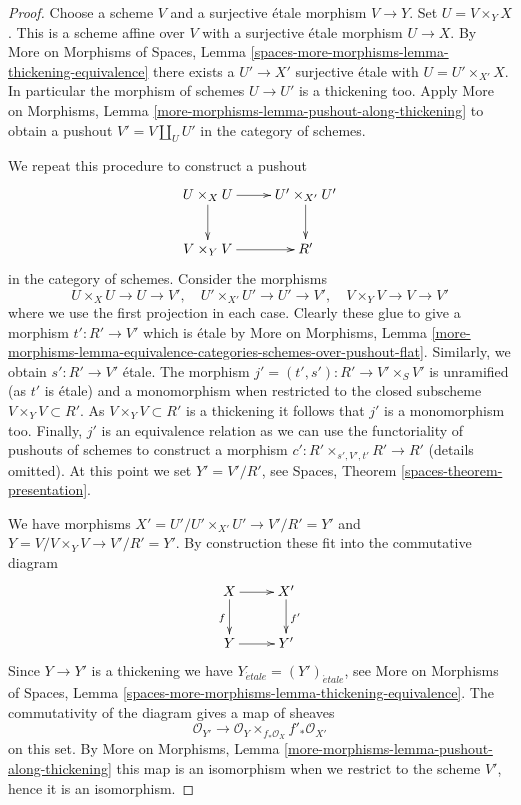 \documentclass[10pt,a4paper]{amsart}
\theoremstyle{plain}
\theoremstyle{definition}
\theoremstyle{remark}
\numberwithin{equation}{subsection}
\def\etale{{\acute{e}tale}}
\begin{document}
\begin{proof}
Choose a scheme $V$ and a surjective \'etale morphism $V \to Y$.
Set $U = V \times_Y X$. This is a scheme affine over $V$ with a
surjective \'etale morphism $U \to X$. By More on Morphisms of Spaces,
Lemma \ref{spaces-more-morphisms-lemma-thickening-equivalence}
there exists a $U' \to X'$
surjective \'etale with $U = U' \times_{X'} X$. In particular the
morphism of schemes $U \to U'$ is a thickening too. Apply
More on Morphisms, Lemma \ref{more-morphisms-lemma-pushout-along-thickening}
to obtain a pushout $V' = V \amalg_U U'$ in the category of schemes.

\medskip\noindent
We repeat this procedure to construct a pushout
$$
\xymatrix{
U \times_X U \ar[d] \ar[r] & U' \times_{X'} U' \ar[d] \\
V \times_Y V \ar[r] & R'
}
$$
in the category of schemes. Consider the morphisms
$$
U \times_X U \to U \to V',\quad
U' \times_{X'} U' \to U' \to V',\quad
V \times_Y V \to V \to V'
$$
where we use the first projection in each case. Clearly these glue to
give a morphism $t' : R' \to V'$ which is \'etale by
More on Morphisms, Lemma
\ref{more-morphisms-lemma-equivalence-categories-schemes-over-pushout-flat}.
Similarly, we obtain $s' : R' \to V'$ \'etale.
The morphism $j' = (t', s') : R' \to V' \times_S V'$ is unramified
(as $t'$ is \'etale) and a monomorphism when restricted to the closed
subscheme $V \times_Y V \subset R'$. As $V \times_Y V \subset R'$ is
a thickening it follows that $j'$ is a monomorphism too. Finally, $j'$
is an equivalence relation as we can use the functoriality of pushouts
of schemes to construct a morphism $c' : R' \times_{s', V', t'} R' \to R'$
(details omitted). At this point we set $Y' = V'/R'$, see
Spaces, Theorem \ref{spaces-theorem-presentation}.

\medskip\noindent
We have morphisms $X' = U'/U' \times_{X'} U' \to V'/R' = Y'$ and
$Y = V/V \times_Y V \to V'/R' = Y'$.
By construction these fit into the commutative diagram
$$
\xymatrix{
X \ar[r] \ar[d]_f & X' \ar[d]^{f'} \\
Y \ar[r] & Y'
}
$$
Since $Y \to Y'$ is a thickening we have
$Y_\etale = (Y')_\etale$, see More on Morphisms of Spaces,
Lemma \ref{spaces-more-morphisms-lemma-thickening-equivalence}.
The commutativity of the diagram gives a map of sheaves
$$
\mathcal{O}_{Y'}
\longrightarrow
\mathcal{O}_Y \times_{f_*\mathcal{O}_X} f'_*\mathcal{O}_{X'}
$$
on this set. By More on Morphisms, Lemma
\ref{more-morphisms-lemma-pushout-along-thickening}
this map is an isomorphism when we restrict to
the scheme $V'$, hence it is an isomorphism.


\end{proof}
\end{document}
